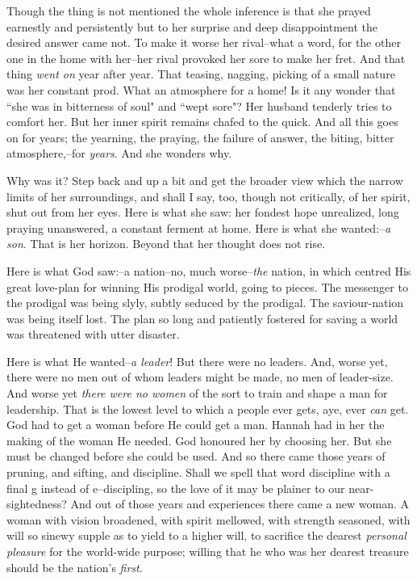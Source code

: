 Though the thing is not mentioned the whole inference is that she prayed
earnestly and persistently but to her surprise and deep disappointment the
desired answer came not. To make it worse her rival--what a word, for the
other one in the home with her--her rival provoked her sore to make her
fret. And that thing \textit{went on} year after year. That teasing, nagging,
picking of a small nature was her constant prod. What an atmosphere for a
home! Is it any wonder that ``she was in bitterness of soul" and ``wept
sore"? Her husband tenderly tries to comfort her. But her inner spirit
remains chafed to the quick. And all this goes on for years; the yearning,
the praying, the failure of answer, the biting, bitter atmosphere,--for
\textit{years}. And she wonders why.

Why was it? Step back and up a bit and get the broader view which the
narrow limits of her surroundings, and shall I say, too, though not
critically, of her spirit, shut out from her eyes. Here is what she saw:
her fondest hope unrealized, long praying unanswered, a constant ferment
at home. Here is what she wanted:--\textit{a son}. That is her horizon. Beyond
that her thought does not rise.

Here is what God saw:--a nation--no, much worse--\textit{the} nation, in which
centred His great love-plan for winning His prodigal world, going to
pieces. The messenger to the prodigal was being slyly, subtly seduced by
the prodigal. The saviour-nation was being itself lost. The plan so long
and patiently fostered for saving a world was threatened with utter
disaster.

Here is what He wanted--\textit{a leader}! But there were no leaders. And, worse
yet, there were no men out of whom leaders might be made, no men of
leader-size. And worse yet \textit{there were no women} of the sort to train and
shape a man for leadership. That is the lowest level to which a people
ever gets, aye, ever \textit{can} get. God had to get a woman before He could get
a man. Hannah had in her the making of the woman He needed. God honoured
her by choosing her. But she must be changed before she could be used. And
so there came those years of pruning, and sifting, and discipline. Shall
we spell that word discipline with a final g instead of e--discipling, so
the love of it may be plainer to our near-sightedness? And out of those
years and experiences there came a new woman. A woman with vision
broadened, with spirit mellowed, with strength seasoned, with will so
sinewy supple as to yield to a higher will, to sacrifice the dearest
\textit{personal pleasure} for the world-wide purpose; willing that he who was
her dearest treasure should be the nation's \textit{first}.


